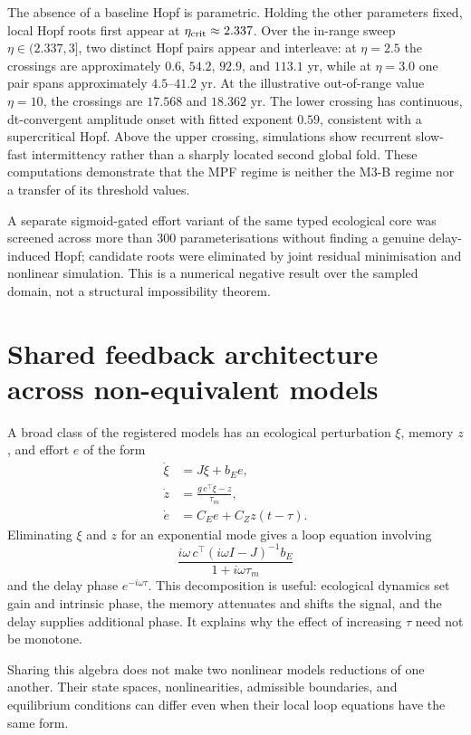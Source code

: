 \documentclass[11pt]{article}
\begin{document}
The absence of a baseline Hopf is parametric. Holding the other parameters fixed, local Hopf roots first appear at $\eta_{\rm crit}\approx2.337$. Over the in-range sweep $\eta\in(2.337,3]$, two distinct Hopf pairs appear and interleave: at $\eta=2.5$ the crossings are approximately $0.6$, $54.2$, $92.9$, and $113.1$ yr, while at $\eta=3.0$ one pair spans approximately $4.5$--$41.2$ yr. At the illustrative out-of-range value $\eta=10$, the crossings are $17.568$ and $18.362$ yr. The lower crossing has continuous, dt-convergent amplitude onset with fitted exponent $0.59$, consistent with a supercritical Hopf. Above the upper crossing, simulations show recurrent slow-fast intermittency rather than a sharply located second global fold. These computations demonstrate that the MPF regime is neither the M3-B regime nor a transfer of its threshold values.

A separate sigmoid-gated effort variant of the same typed ecological core was screened across more than 300 parameterisations without finding a genuine delay-induced Hopf; candidate roots were eliminated by joint residual minimisation and nonlinear simulation. This is a numerical negative result over the sampled domain, not a structural impossibility theorem.

\section{Shared feedback architecture across non-equivalent models}

A broad class of the registered models has an ecological perturbation $\xi$, memory $z$, and effort $e$ of the form
\begin{align}
\dot\xi&=J\xi+b_Ee,\\
\dot z&=\frac{g\,c^\top\dot\xi-z}{\tau_m},\\
\dot e&=C_Ee+C_Zz(t-\tau).
\end{align}
Eliminating $\xi$ and $z$ for an exponential mode gives a loop equation involving
\[
\frac{i\omega\,c^\top(i\omega I-J)^{-1}b_E}{1+i\omega\tau_m}
\]
and the delay phase $e^{-i\omega\tau}$. This decomposition is useful: ecological dynamics set gain and intrinsic phase, the memory attenuates and shifts the signal, and the delay supplies additional phase. It explains why the effect of increasing $\tau$ need not be monotone.

Sharing this algebra does not make two nonlinear models reductions of one another. Their state spaces, nonlinearities, admissible boundaries, and equilibrium conditions can differ even when their local loop equations have the same form.
\end{document}
